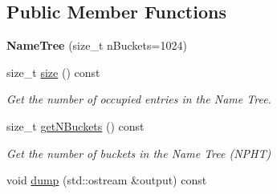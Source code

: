 \subsection*{Public Member Functions}
\begin{DoxyCompactItemize}
\item 
{\bfseries Name\+Tree} (size\+\_\+t n\+Buckets=1024)\hypertarget{classnfd_1_1NameTree_a4538dc8de85dc2babeedc180e7e35d35}{}\label{classnfd_1_1NameTree_a4538dc8de85dc2babeedc180e7e35d35}

\item 
size\+\_\+t \hyperlink{classnfd_1_1NameTree_a63c93c095960a049891c366c00e20f9c}{size} () const\hypertarget{classnfd_1_1NameTree_a63c93c095960a049891c366c00e20f9c}{}\label{classnfd_1_1NameTree_a63c93c095960a049891c366c00e20f9c}

\begin{DoxyCompactList}\small\item\em Get the number of occupied entries in the Name Tree. \end{DoxyCompactList}\item 
size\+\_\+t \hyperlink{classnfd_1_1NameTree_ace51ed4f02b30c819c27ea9e7a0e6e3d}{get\+N\+Buckets} () const
\begin{DoxyCompactList}\small\item\em Get the number of buckets in the Name Tree (N\+P\+HT) \end{DoxyCompactList}\item 
void \hyperlink{classnfd_1_1NameTree_a9adcf39d2d2a37ce28b6f6ca3488abfa}{dump} (std\+::ostream \&output) const\hypertarget{classnfd_1_1NameTree_a9adcf39d2d2a37ce28b6f6ca3488abfa}{}\label{classnfd_1_1NameTree_a9adcf39d2d2a37ce28b6f6ca3488abfa}


\end{DoxyCompactItemize}
